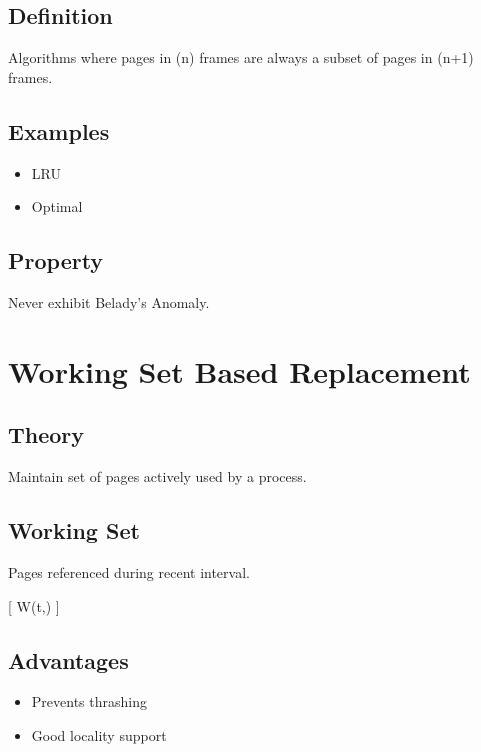 \subsection{Definition}

Algorithms where pages in (n) frames are always a subset of pages in (n+1) frames.

\subsection{Examples}

\begin{itemize}
\item LRU
\item Optimal
\end{itemize}

\subsection{Property}

Never exhibit Belady's Anomaly.

\section{Working Set Based Replacement}

\subsection{Theory}

Maintain set of pages actively used by a process.

\subsection{Working Set}

Pages referenced during recent interval.

[
W(t,\Delta)
]

\subsection{Advantages}

\begin{itemize}
\item Prevents thrashing
\item Good locality support
\end{itemize}

